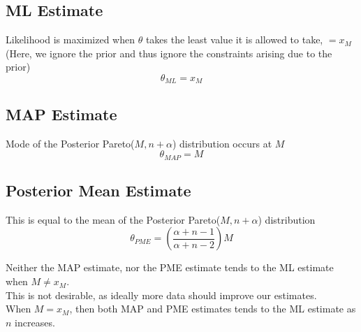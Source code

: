 \documentclass[11pt, fleqn]{article}
\begin{document}
\subsection*{ML Estimate}
Likelihood is maximized when $\theta$ takes the least value it is allowed to take, $= x_M$ (Here, we ignore the prior and thus ignore the constraints arising due to the prior)
$$
    \boxed{\theta_{ML} = x_M}
$$
\subsection*{MAP Estimate}
Mode of the Posterior Pareto($M, n+\alpha$) distribution occurs at $M$
$$
    \boxed{\theta_{MAP} = M}
$$
\subsection*{Posterior Mean Estimate}
This is equal to the mean of the Posterior Pareto($M, n+\alpha$) distribution
$$
    \boxed{\theta_{PME} = \left(\frac{\alpha + n - 1}{\alpha + n - 2}\right)M}
$$
  
\medskip
Neither the MAP estimate, nor the PME estimate tends to the ML estimate when $M \neq x_M$.\\
This is not desirable, as ideally more data should improve our estimates.\\
When $M = x_M$, then both MAP and PME estimates tends to the ML estimate as $n$ increases.
\end{document}

